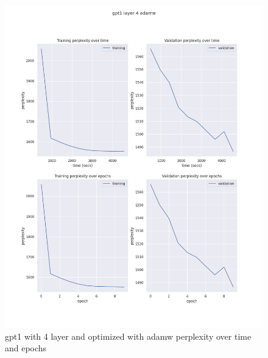 \documentclass[12pt]{article}
\theoremstyle{definition}
\begin{document}
\begin{figure}[H]
     \centering
     \includegraphics[scale=0.4]{gpt1_layer_4_adamw.png}
     \caption{gpt1 with 4 layer and optimized with adamw perplexity over time and epochs}
\end{figure}
\end{document}

